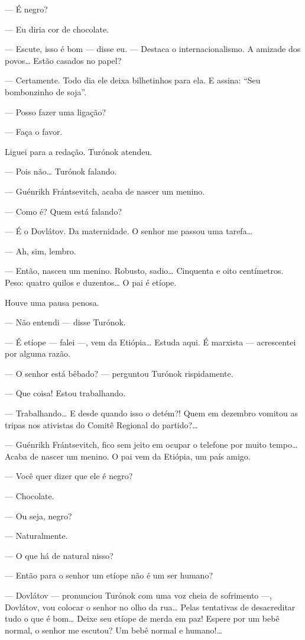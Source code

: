 --- É negro?

--- Eu diria cor de chocolate.

--- Escute, isso é bom --- disse eu. --- Destaca o internacionalismo. A
amizade dos povos\ldots{} Estão casados no papel?

--- Certamente. Todo dia ele deixa bilhetinhos para ela. E assina: ``Seu
bombonzinho de soja''.

--- Posso fazer uma ligação?

--- Faça o favor.

Liguei para a redação. Turónok atendeu.

--- Pois não\ldots{} Turónok falando.

--- Guénrikh Frántsevitch, acaba de nascer um menino.

--- Como é? Quem está falando?

--- É o Dovlátov. Da maternidade. O senhor me passou uma tarefa\ldots{}

--- Ah, sim, lembro.

--- Então, nasceu um menino. Robusto, sadio\ldots{} Cinquenta e oito
centímetros. Peso: quatro quilos e duzentos\ldots{} O pai é etíope.

Houve uma pausa penosa.

--- Não entendi --- disse Turónok.

--- É etíope --- falei ---, vem da Etiópia\ldots{} Estuda aqui. É marxista
--- acrescentei por alguma razão.

--- O senhor está bêbado? --- perguntou Turónok rispidamente.

--- Que coisa! Estou trabalhando.

--- Trabalhando\ldots{} E desde quando isso o detém?! Quem em dezembro
vomitou as tripas nos ativistas do Comitê Regional do partido?\ldots{}

--- Guénrikh Frántsevitch, fico sem jeito em ocupar o telefone por muito
tempo\ldots{} Acaba de nascer um menino. O pai vem da Etiópia, um país amigo.

--- Você quer dizer que ele é negro?

--- Chocolate.

--- Ou seja, negro?

--- Naturalmente.

--- O que há de natural nisso?

--- Então para o senhor um etíope não é um ser humano?

--- Dovlátov --- pronunciou Turónok com uma voz cheia de sofrimento ---,
Dovlátov, vou colocar o senhor no olho da rua\ldots{} Pelas tentativas de
desacreditar tudo o que é bom\ldots{} Deixe seu etíope de merda em paz!
Espere por um bebê normal, o senhor me escutou? Um bebê normal e
humano!\ldots{}

